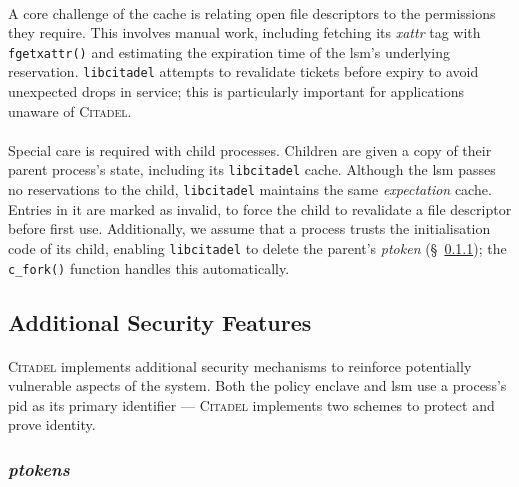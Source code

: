 \paragraph{} A core challenge of the cache is relating open file descriptors to the permissions they require. This involves manual work, including fetching its \textit{\acrshort{xattr}} tag with \texttt{fgetxattr()} and estimating the expiration time of the \acrshort{lsm}'s underlying reservation. \texttt{libcitadel} attempts to revalidate tickets before expiry to avoid unexpected drops in service; this is particularly important for applications unaware of \textsc{Citadel}.

\paragraph{} Special care is required with child processes. Children are given a copy of their parent process's state, including its \texttt{libcitadel} cache. Although the \acrshort{lsm} passes no reservations to the child, \texttt{libcitadel} maintains the same \textit{expectation} cache. Entries in it are marked as invalid, to force the child to revalidate a file descriptor before first use. Additionally, we assume that a process trusts the initialisation code of its child, enabling \texttt{libcitadel} to delete the parent's \textit{ptoken} (§~\ref{sec:ptokens}); the \texttt{c\_fork()} function handles this automatically.


\subsection{Additional Security Features}
\label{sec:additional-security}
\paragraph{} \textsc{Citadel} implements additional security mechanisms to reinforce potentially vulnerable aspects of the system. Both the policy enclave and \acrshort{lsm} use a process's \acrshort{pid} as its primary identifier --- \textsc{Citadel} implements two schemes to protect and prove identity.

\subsubsection{\textit{ptokens}}
\label{sec:ptokens}

